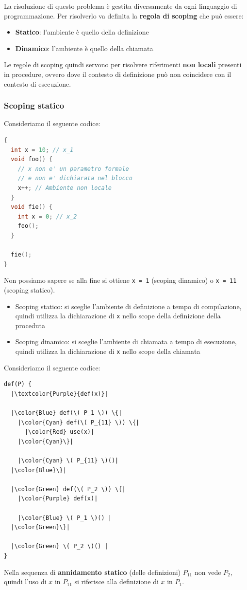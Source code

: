 \documentclass[a4paper]{article}
\begin{document}
\noindent
La risoluzione di questo problema è gestita diversamente da ogni linguaggio di
programmazione. Per risolverlo va definita la \textbf{regola di scoping} che
può essere:
\begin{itemize}
  \item \textbf{Statico}: l'ambiente è quello della definizione
  \item \textbf{Dinamico}: l'ambiente è quello della chiamata
\end{itemize}
Le regole di scoping quindi servono per risolvere riferimenti \textbf{non locali}
presenti in procedure, ovvero dove il contesto di definizione può non
coincidere con il contesto di esecuzione.

\subsubsection{Scoping statico}
\begin{example}
  Consideriamo il seguente codice:
\begin{lstlisting}[language=C]
{
  int x = 10; // x_1
  void foo() {
    // x non e' un parametro formale
    // e non e' dichiarata nel blocco
    x++; // Ambiente non locale
  }
  void fie() {
    int x = 0; // x_2
    foo();
  }

  fie();
}
\end{lstlisting}
Non possiamo sapere se alla fine si ottiene \texttt{x = 1} (scoping dinamico) o
\texttt{x = 11} (scoping statico).
\begin{itemize}
  \item Scoping statico: si sceglie l'ambiente di definizione a tempo di compilazione,
    quindi utilizza la dichiarazione di \texttt{x} nello scope della definizione
    della proceduta
  \item Scoping dinamico: si sceglie l'ambiente di chiamata a tempo di esecuzione,
    quindi utilizza la dichiarazione di \texttt{x} nello scope della chiamata
\end{itemize}
\end{example}

\noindent
Consideriamo il seguente codice:
\begin{lstlisting}[escapechar=|, basicstyle=\ttfamily, columns=fullflexible, keepspaces=true]
def(P) {
  |\textcolor{Purple}{def(x)}|

  |\color{Blue} def(\( P_1 \)) \{|
    |\color{Cyan} def(\( P_{11} \)) \{|
      |\color{Red} use(x)|
    |\color{Cyan}\}|

    |\color{Cyan} \( P_{11} \)()|
  |\color{Blue}\}|

  |\color{Green} def(\( P_2 \)) \{|
    |\color{Purple} def(x)|

    |\color{Blue} \( P_1 \)() |
  |\color{Green}\}|

  |\color{Green} \( P_2 \)() |
}
\end{lstlisting}
Nella sequenza di \textbf{annidamento statico} (delle definizioni) \( P_{11} \)  non
vede \( P_2 \), quindi l'uso di \( x \) in \( P_{11} \) si riferisce alla definizione
di \( x \) in \( P_1 \).
\end{document}
